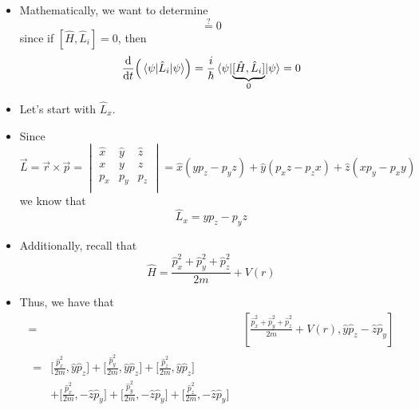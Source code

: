 \documentclass[../notes.tex]{subfiles}
\begin{document}
\begin{itemize}
    \begin{itemize}
        \item Mathematically, we want to determine
        \begin{equation*}
            [\hat{H},\hat{L}_i] \stackrel{?}{=} 0
        \end{equation*}
        since if $[\hat{H},\hat{L}_i]=0$, then
        \begin{equation*}
            \dv{t}(\ev{\hat{L}_i}{\psi}) = \frac{i}{\hbar}\ev{\underbrace{[\hat{H},\hat{L}_i]}_0}{\psi}
            = 0
        \end{equation*}
        \item Let's start with $\hat{L}_x$.
        \item Since
        \begin{equation*}
            \vec{L} = \vec{r}\times\vec{p}
            =
            \begin{vmatrix}
                \hat{x} & \hat{y} & \hat{z}\\
                x & y & z\\
                p_x & p_y & p_z\\
            \end{vmatrix}
            = \hat{x}(yp_z-p_yz)+\hat{y}(p_xz-p_zx)+\hat{z}(xp_y-p_xy)
        \end{equation*}
        we know that
        \begin{equation*}
            \hat{L}_x = yp_z-p_yz
        \end{equation*}
        \item Additionally, recall that
        \begin{equation*}
            \hat{H} = \frac{\hat{p}_x^2+\hat{p}_y^2+\hat{p}_z^2}{2m}+V(r)
        \end{equation*}
        \item Thus, we have that
        \begin{align*}
            [\hat{H},\hat{L}_x] ={}& \left[ \frac{\hat{p}_x^2+\hat{p}_y^2+\hat{p}_z^2}{2m}+V(r),\hat{y}\hat{p}_z-\hat{z}\hat{p}_y \right]\\
            \begin{split}
                ={}& \Bigg[ \frac{\hat{p}_x^2}{2m},\hat{y}\hat{p}_z \Bigg]+\Bigg[ \frac{\hat{p}_y^2}{2m},\hat{y}\hat{p}_z \Bigg]+\Bigg[ \frac{\hat{p}_z^2}{2m},\hat{y}\hat{p}_z \Bigg]\\
                & +\Bigg[ \frac{\hat{p}_x^2}{2m},-\hat{z}\hat{p}_y \Bigg]+\Bigg[ \frac{\hat{p}_y^2}{2m},-\hat{z}\hat{p}_y \Bigg]+\Bigg[ \frac{\hat{p}_z^2}{2m},-\hat{z}\hat{p}_y \Bigg]\\

\end{split}
\end{align*}
\end{itemize}
\end{itemize}
\end{document}
